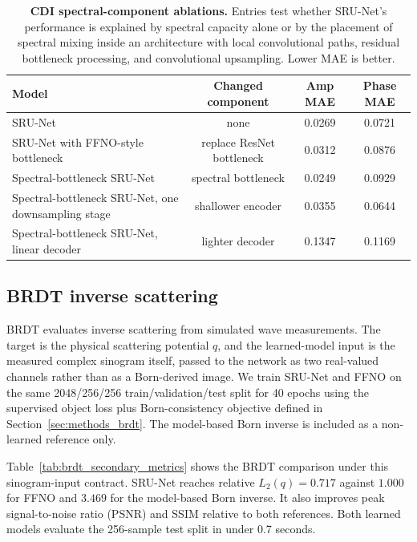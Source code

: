\documentclass[11pt]{article}
\begin{document}
\begin{table}[t]
\centering
\small
\setlength{\tabcolsep}{4pt}
\caption{\textbf{CDI spectral-component ablations.} Entries test whether SRU-Net's
performance is explained by spectral capacity alone or by the placement of
spectral mixing inside an architecture with local convolutional paths, residual
bottleneck processing, and convolutional upsampling. Lower MAE is better.}
\label{tab:cdi_arch_ablations}
\begin{tabular}{lccc}
\toprule
Model & Changed component & Amp MAE & Phase MAE \\
\midrule
SRU-Net & none & 0.0269 & 0.0721 \\
SRU-Net with FFNO-style bottleneck & replace ResNet bottleneck & 0.0312 & 0.0876 \\
Spectral-bottleneck SRU-Net & spectral bottleneck & 0.0249 & 0.0929 \\
Spectral-bottleneck SRU-Net, one downsampling stage & shallower encoder & 0.0355 & 0.0644 \\
Spectral-bottleneck SRU-Net, linear decoder & lighter decoder & 0.1347 & 0.1169 \\
\bottomrule
\end{tabular}
\end{table}

\subsection{BRDT inverse scattering}

BRDT evaluates inverse scattering from simulated wave measurements. The target
is the physical scattering potential $q$, and the learned-model input is the
measured complex sinogram itself, passed to the network as two real-valued
channels rather than as a Born-derived image. We train SRU-Net and FFNO on the
same 2048/256/256 train/validation/test split for 40 epochs using the
supervised object loss plus Born-consistency objective defined in
Section~\ref{sec:methods_brdt}. The model-based Born inverse is included as a
non-learned reference only.

Table~\ref{tab:brdt_secondary_metrics} shows the BRDT comparison under this
sinogram-input contract. SRU-Net reaches relative $L_2(q) = 0.717$ against
$1.000$ for FFNO and $3.469$ for the model-based Born inverse. It also
improves peak signal-to-noise ratio (PSNR) and SSIM relative to both
references. Both learned models evaluate the 256-sample test split in under
0.7 seconds.
\end{document}

